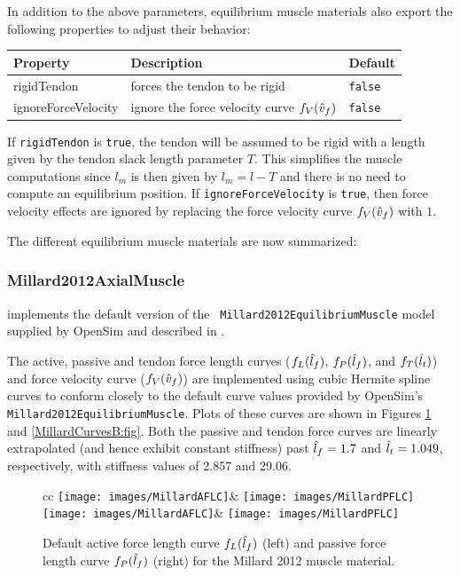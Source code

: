 In addition to the above parameters, equilibrium muscle materials also
export the following properties to adjust their behavior:

\begin{center}
\begin{tabular}{|l|l|l|} 
\hline
Property & Description & Default \\
\hline
{\sf rigidTendon} & forces the tendon to be rigid & {\tt false} \\
{\sf ignoreForceVelocity} & 
ignore the force velocity curve $f_V(\hat{v}_f)$ & {\tt false} \\
\hline
\end{tabular}
\end{center}

If {\tt rigidTendon} is {\tt true}, the tendon will be assumed to be
rigid with a length given by the tendon slack length parameter $T$.
This simplifies the muscle computations since $l_m$ is then given by
$l_m = l - T$ and there is no need to compute an equilibrium position.
If {\tt ignoreForceVelocity} is {\tt true}, then force velocity
effects are ignored by replacing the force velocity curve $f_V(\hat{v}_f)$
with $1$.

The different equilibrium muscle materials are now summarized:

\subsubsection{Millard2012AxialMuscle}
\label{Millard2012AxialMuscle:sec}

implements the default version of the {\tt
Millard2012EquilibriumMuscle} model supplied by OpenSim
\cite{delp2007opensim} and described in \cite{millard2013flexing}.

The active, passive and tendon force length curves ($f_L(\hat{l}_f)$,
$f_P(\hat{l}_f)$, and $f_T(\hat{l}_t)$) and force velocity curve ($f_V(\hat{v}_f)$)
are implemented using cubic Hermite spline curves to conform closely
to the default curve values provided by OpenSim's {\tt
Millard2012EquilibriumMuscle}. Plots of these curves are shown in
Figures \ref{MillardCurvesA:fig} and \ref{MillardCurvesB:fig}.  Both
the passive and tendon force curves are linearly extrapolated (and
hence exhibit constant stiffness) past $\hat{l}_f = 1.7$ and
$\hat{l}_t = 1.049$, respectively, with stiffness values of 2.857 and
29.06.

\begin{figure}[ht]
\begin{center}
\begin{tabular}{cc}
   \iflatexml
      \texttt{[image: images/MillardAFLC]}&
      \texttt{[image: images/MillardPFLC]}
   \else
      \texttt{[image: images/MillardAFLC]}&
      \texttt{[image: images/MillardPFLC]}
   \fi
\end{tabular}
\end{center}
\caption{Default active force length curve $f_L(\hat{l}_f)$ (left) and 
passive force length curve $f_P(\hat{l}_f)$ (right) for the Millard 2012
muscle material.}
\label{MillardCurvesA:fig}
\end{figure}

